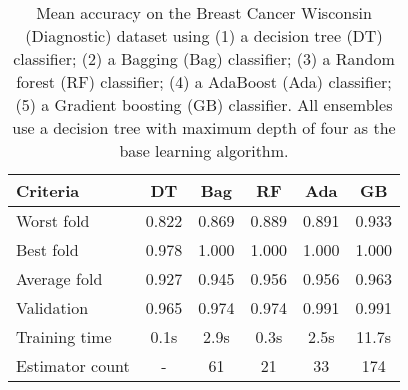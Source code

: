 \begin{table}[htbp]
    \centering
    \begin{tabular}{l c c c c c}
    \toprule
    Criteria        & DT    & Bag       & RF    & Ada   & GB \\
    \midrule
    Worst fold      & 0.822 & 0.869     & 0.889 & 0.891 & 0.933\\
    Best fold       & 0.978 & 1.000     & 1.000 & 1.000 & 1.000\\
    Average fold    & 0.927 & 0.945     & 0.956 & 0.956 & 0.963\\
    Validation      & 0.965 & 0.974     & 0.974 & 0.991 & 0.991\\
    Training time   & 0.1s  & 2.9s      & 0.3s  & 2.5s  & 11.7s\\
    Estimator count & -     & 61        & 21    & 33    & 174 \\
    \bottomrule
    \end{tabular}
    \caption{
        Mean accuracy on the Breast Cancer Wisconsin (Diagnostic) dataset using 
        (1) a decision tree (DT) classifier;
        (2) a Bagging (Bag) classifier;
        (3) a Random forest (RF) classifier; 
        (4) a AdaBoost (Ada) classifier; 
        (5) a Gradient boosting (GB) classifier.
        All ensembles use a decision tree with maximum depth of four as 
        the base learning algorithm.
    }
\end{table}